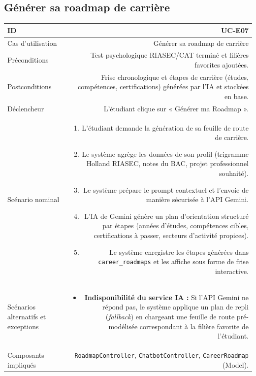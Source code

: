 \vspace{1.5em}

\subsection{Générer sa roadmap de carrière}

\noindent
{}
\begin{tabularx}{\linewidth}{|L|R|}
\hline
{}ID & UC-E07 \\
\hline
Cas d'utilisation & Générer sa roadmap de carrière \\
\hline
{}Préconditions & Test psychologique RIASEC/CAT terminé et filières favorites ajoutées. \\
\hline
Postconditions & Frise chronologique et étapes de carrière (études, compétences, certifications) générées par l'IA et stockées en base. \\
\hline
{}Déclencheur & L'étudiant clique sur « Générer ma Roadmap ». \\
\hline
Scénario nominal &
\begin{enumerate}[nosep,leftmargin=*]
  \item L'étudiant demande la génération de sa feuille de route de carrière.
  \item Le système agrège les données de son profil (trigramme Holland RIASEC, notes du BAC, projet professionnel souhaité).
  \item Le système prépare le prompt contextuel et l'envoie de manière sécurisée à l'API Gemini.
  \item L'IA de Gemini génère un plan d'orientation structuré par étapes (années d'études, compétences cibles, certifications à passer, secteurs d'activité propices).
  \item Le système enregistre les étapes générées dans \texttt{career\_roadmaps} et les affiche sous forme de frise interactive.
\end{enumerate} \\
\hline
{}Scénarios alternatifs et exceptions &
\begin{itemize}[nosep,leftmargin=*]
  \item \textbf{Indisponibilité du service IA :} Si l'API Gemini ne répond pas, le système applique un plan de repli (\textit{fallback}) en chargeant une feuille de route pré-modélisée correspondant à la filière favorite de l'étudiant.
\end{itemize} \\
\hline
Composants impliqués & \texttt{RoadmapController}, \texttt{ChatbotController}, \texttt{CareerRoadmap} (Model). \\
\hline
\end{tabularx}

